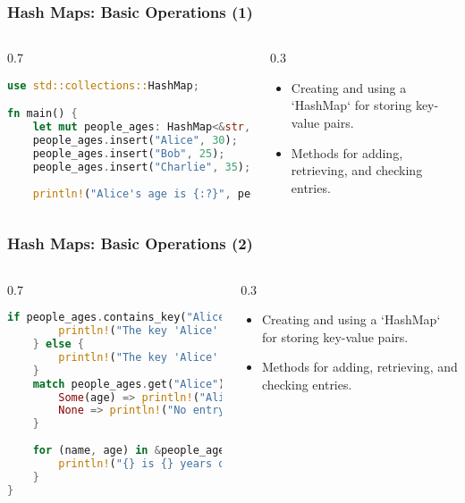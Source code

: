 \documentclass[aspectratio=169, table]{beamer}
\begin{document}
\begin{frame}[fragile]
\frametitle{Hash Maps: Basic Operations (1)}
\vspace{10pt}
\begin{columns}[T,onlytextwidth]
\begin{column}{0.7\textwidth}
\begin{lstlisting}[language=Rust]
use std::collections::HashMap;

fn main() {
	let mut people_ages: HashMap<&str, i32> = HashMap::new();
	people_ages.insert("Alice", 30);
	people_ages.insert("Bob", 25);
	people_ages.insert("Charlie", 35);
	
	println!("Alice's age is {:?}", people_ages.get("Alice").unwrap());
\end{lstlisting}
\end{column}
\begin{column}{0.3\textwidth}
\begin{itemize}
	\item Creating and using a `HashMap` for storing key-value pairs.
	\item Methods for adding, retrieving, and checking entries.
\end{itemize}
\end{column}
\end{columns}
\end{frame}


\begin{frame}[fragile]
\frametitle{Hash Maps: Basic Operations (2)}
\vspace{20pt}
\begin{columns}[T,onlytextwidth]
\begin{column}{0.7\textwidth}
\begin{lstlisting}[language=Rust,firstnumber=10]
	if people_ages.contains_key("Alice") {
		println!("The key 'Alice' is present.");
	} else {
		println!("The key 'Alice' is not found.");
	}
	match people_ages.get("Alice") {
		Some(age) => println!("Alice's age: {}", age),
		None => println!("No entry for Alice."),
	}
	
	for (name, age) in &people_ages {
		println!("{} is {} years old", name, age);
	}
}
\end{lstlisting}
\end{column}
\begin{column}{0.3\textwidth}
	\begin{itemize}
		\item Creating and using a `HashMap` for storing key-value pairs.
		\item Methods for adding, retrieving, and checking entries.
	\end{itemize}
\end{column}
\end{columns}
\end{frame}
\end{document}
